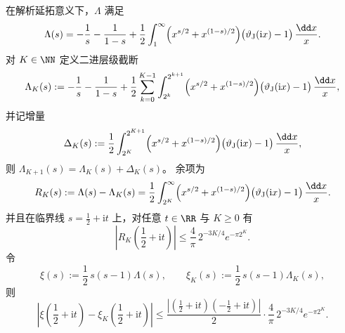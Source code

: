 \begin{theorem}[二进尺度递归的完成核分解与超指数余项界]\label{thm:xi-completed-zeta-dyadic-remainder-budget}
在解析延拓意义下，\(\Lambda\) 满足
\begin{equation}\label{eq:xi-completed-zeta-lambda-symmetric-integral}
\Lambda(s)
=-\frac1s-\frac1{1-s}
+\frac12\int_{1}^{\infty}
\Bigl(x^{s/2}+x^{(1-s)/2}\Bigr)\bigl(\vartheta_{\mathrm J}(\mathrm{i}x)-1\bigr)\,\frac{\dd x}{x}.
\end{equation}
对 \(K\in\NN\) 定义二进层级截断
\begin{equation}\label{eq:xi-completed-zeta-lambdaK-def}
\Lambda_K(s):=
-\frac1s-\frac1{1-s}
+\frac12\sum_{k=0}^{K-1}\int_{2^k}^{2^{k+1}}
\Bigl(x^{s/2}+x^{(1-s)/2}\Bigr)\bigl(\vartheta_{\mathrm J}(\mathrm{i}x)-1\bigr)\,\frac{\dd x}{x},
\end{equation}
并记增量
\begin{equation}\label{eq:xi-completed-zeta-lambdaK-increment}
\Delta_K(s):=
\frac12\int_{2^K}^{2^{K+1}}
\Bigl(x^{s/2}+x^{(1-s)/2}\Bigr)\bigl(\vartheta_{\mathrm J}(\mathrm{i}x)-1\bigr)\,\frac{\dd x}{x},
\end{equation}
则 \(\Lambda_{K+1}(s)=\Lambda_K(s)+\Delta_K(s)\)。
余项为
\begin{equation}\label{eq:xi-completed-zeta-lambdaK-remainder}
R_K(s):=\Lambda(s)-\Lambda_K(s)
=\frac12\int_{2^K}^{\infty}
\Bigl(x^{s/2}+x^{(1-s)/2}\Bigr)\bigl(\vartheta_{\mathrm J}(\mathrm{i}x)-1\bigr)\,\frac{\dd x}{x}.
\end{equation}
并且在临界线 \(s=\frac12+\mathrm{i}t\) 上，对任意 \(t\in\RR\) 与 \(K\ge 0\) 有
\begin{equation}\label{eq:xi-completed-zeta-critical-remainder-bound}
\left|R_K\!\left(\frac12+\mathrm{i}t\right)\right|
\le \frac{4}{\pi}\,2^{-3K/4}e^{-\pi 2^K}.
\end{equation}
令
\begin{equation}\label{eq:xi-completed-zeta-xiK-def}
\xi(s):=\frac12\,s(s-1)\Lambda(s),
\qquad
\xi_K(s):=\frac12\,s(s-1)\Lambda_K(s),
\end{equation}
则
\begin{equation}\label{eq:xi-completed-zeta-xiK-error-budget}
\left|\xi\!\left(\frac12+\mathrm{i}t\right)-\xi_K\!\left(\frac12+\mathrm{i}t\right)\right|
\le
\frac{\left|\left(\frac12+\mathrm{i}t\right)\left(-\frac12+\mathrm{i}t\right)\right|}{2}
\cdot
\frac{4}{\pi}\,2^{-3K/4}e^{-\pi 2^K}.
\end{equation}
\end{theorem}
